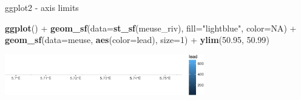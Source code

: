 \documentclass[11pt,ignorenonframetext,]{beamer}
\newenvironment{Shaded}{}{}
\newcommand{\DataTypeTok}[1]{\textcolor[rgb]{0.56,0.13,0.00}{#1}}
\newcommand{\DecValTok}[1]{\textcolor[rgb]{0.25,0.63,0.44}{#1}}
\newcommand{\FloatTok}[1]{\textcolor[rgb]{0.25,0.63,0.44}{#1}}
\newcommand{\KeywordTok}[1]{\textcolor[rgb]{0.00,0.44,0.13}{\textbf{#1}}}
\newcommand{\NormalTok}[1]{#1}
\newcommand{\OperatorTok}[1]{\textcolor[rgb]{0.40,0.40,0.40}{#1}}
\newcommand{\OtherTok}[1]{\textcolor[rgb]{0.00,0.44,0.13}{#1}}
\newcommand{\StringTok}[1]{\textcolor[rgb]{0.25,0.44,0.63}{#1}}
\let\oldShaded\Shaded
\let\endoldShaded\endShaded
\renewenvironment{Shaded}{\footnotesize\begin{spacing}{0.9}\oldShaded}{\endoldShaded\end{spacing}}
\let\oldverbatim\verbatim
\let\endoldverbatim\endverbatim
\newcommand{\scriptoutput}{
  \renewenvironment{Shaded}{\scriptsize\begin{spacing}{0.9}\oldShaded}{\endoldShaded\end{spacing}}
  \renewenvironment{verbatim}{\scriptsize\begin{spacing}{0.9}\oldverbatim}{\endoldverbatim\end{spacing}}
}
\begin{document}
\begin{frame}[fragile,t]{ggplot2 - axis limits}
\protect\hypertarget{ggplot2---axis-limits}{}

\scriptoutput

\begin{Shaded}
\begin{Highlighting}[]
\KeywordTok{ggplot}\NormalTok{() }\OperatorTok{+}
\StringTok{  }\KeywordTok{geom_sf}\NormalTok{(}\DataTypeTok{data=}\KeywordTok{st_sf}\NormalTok{(meuse_riv), }\DataTypeTok{fill=}\StringTok{"lightblue"}\NormalTok{, }\DataTypeTok{color=}\OtherTok{NA}\NormalTok{) }\OperatorTok{+}
\StringTok{  }\KeywordTok{geom_sf}\NormalTok{(}\DataTypeTok{data=}\NormalTok{meuse, }\KeywordTok{aes}\NormalTok{(}\DataTypeTok{color=}\NormalTok{lead), }\DataTypeTok{size=}\DecValTok{1}\NormalTok{) }\OperatorTok{+}
\StringTok{  }\KeywordTok{ylim}\NormalTok{(}\FloatTok{50.95}\NormalTok{, }\FloatTok{50.99}\NormalTok{)}
\end{Highlighting}
\end{Shaded}

\begin{center}\includegraphics[width=0.65\textwidth]{Lec16_files/figure-beamer/unnamed-chunk-14-1} \end{center}

\end{frame}
\end{document}
